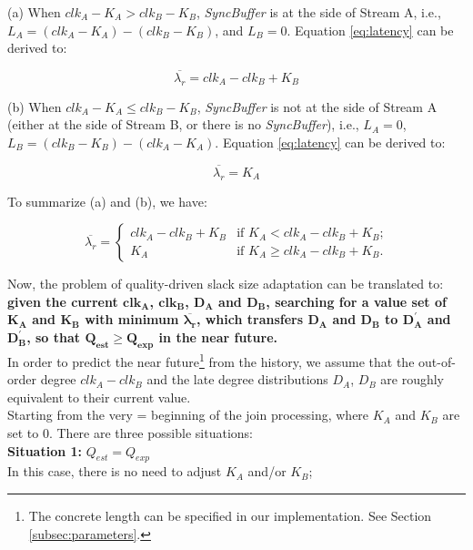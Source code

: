 \documentclass[a4paper, 11pt, twoside]{report}
\begin{document}
(a) When $clk_A-K_A>clk_B-K_B$, \textit{SyncBuffer} is at the side of Stream A, i.e., $L_A=(clk_A-K_A)-(clk_B-K_B)$, and $L_B=0$. Equation \ref{eq:latency} can be derived to:

\begin{equation}
	\overline{\lambda _r}=clk_A-clk_B+K_B
\end{equation}

(b) When $clk_A-K_A \leq clk_B-K_B$, \textit{SyncBuffer} is not at the side of Stream A (either at the side of Stream B, or there is no \textit{SyncBuffer}), i.e., $L_A=0$, $L_B=(clk_B-K_B)-(clk_A-K_A)$. Equation \ref{eq:latency} can be derived to:

\begin{equation}
	\overline{\lambda _r}=K_A
\end{equation}

To summarize (a) and (b), we have:

\begin{equation}
\label{eq:latency-derive}
	\overline{\lambda _r}=
		\begin{cases}
		clk_A-clk_B+K_B	&\mbox {if $K_A<clk_A-clk_B+K_B$;}\\
		K_A				&\mbox {if $K_A \geq clk_A-clk_B+K_B$.}
		\end{cases}
\end{equation}

Now, the problem of quality-driven slack size adaptation can be translated to: \textbf{given the current $\bm{clk_A}$, $\bm{clk_B}$, $\bm{D_A}$ and $\bm{D_B}$, searching for a value set of $\bm{K_A}$ and $\bm{K_B}$ with minimum $\bm{\overline{\lambda _r}}$, which transfers $\bm{D_A}$ and $\bm{D_B}$ to $\bm{D_A^{\prime}}$ and $\bm{D_B^{\prime}}$, so that $\bm{Q_{est} \geq Q_{exp}}$ in the near future.}\\

In order to predict the near future\footnote{The concrete length can be specified in our implementation. See Section \ref{subsec:parameters}.} from the history, we assume that the out-of-order degree $clk_A-clk_B$ and the late degree distributions $D_A$, $D_B$ are roughly equivalent to their current value.\\

Starting from the very = beginning of the join processing, where $K_A$ and $K_B$ are set to 0. There are three possible situations:\\

\textbf{Situation 1:} $Q_{est} = Q_{exp}$\\
In this case, there is no need to adjust $K_A$ and/or $K_B$;\\
\end{document}
